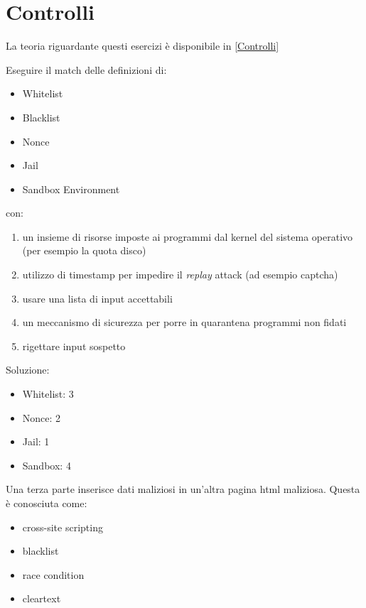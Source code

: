 \section{Controlli}
\label{es:Controlli}

La teoria riguardante questi esercizi è disponibile in \ref{Controlli}

\begin{Exercise} [
  title={Associa i termini},
  label={esControlli1}
  ]

  \Question Eseguire il match delle definizioni di:
\begin{itemize}
\item Whitelist
\item Blacklist
\item Nonce
\item Jail
\item Sandbox Environment
\end{itemize}
con:
\begin{enumerate}
 \item un insieme di risorse imposte ai programmi dal kernel del sistema 
operativo (per esempio la quota disco)
 \item utilizzo di timestamp per impedire il \textit{replay} attack (ad esempio 
captcha)
 \item usare una lista di input accettabili
 \item un meccanismo di sicurezza per porre in quarantena programmi non fidati
 \item rigettare input sospetto
\end{enumerate}

\end{Exercise}

\begin{Answer} [
  ref={esControlli1},
  number={1}
  ]

  \Question Soluzione:
\begin{itemize}
\item Whitelist: 3 
\item Nonce: 2
\item Jail: 1
\item Sandbox: 4

\end{itemize}

\end{Answer}



\begin{Exercise} [
  title={Quiz},
  label={esControlli2}
  ]

  \Question Una terza parte inserisce dati maliziosi in un'altra pagina html 
maliziosa. Questa è conosciuta come:
\begin{itemize}
\item cross-site scripting
\item blacklist
\item race condition
\item cleartext
\end{itemize}

\end{Exercise}

